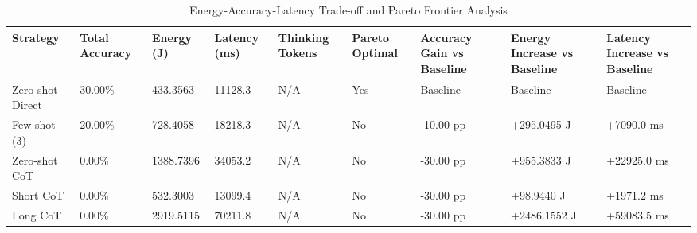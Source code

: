 \begin{table}
\caption{Energy-Accuracy-Latency Trade-off and Pareto Frontier Analysis}
\label{tab:tradeoff_comparison}
\begin{tabular}{lllllllll}
\toprule
Strategy & Total Accuracy & Energy (J) & Latency (ms) & Thinking Tokens & Pareto Optimal & Accuracy Gain vs Baseline & Energy Increase vs Baseline & Latency Increase vs Baseline \\
\midrule
Zero-shot Direct & 30.00\% & 433.3563 & 11128.3 & N/A & Yes & Baseline & Baseline & Baseline \\
Few-shot (3) & 20.00\% & 728.4058 & 18218.3 & N/A & No & -10.00 pp & +295.0495 J & +7090.0 ms \\
Zero-shot CoT & 0.00\% & 1388.7396 & 34053.2 & N/A & No & -30.00 pp & +955.3833 J & +22925.0 ms \\
Short CoT & 0.00\% & 532.3003 & 13099.4 & N/A & No & -30.00 pp & +98.9440 J & +1971.2 ms \\
Long CoT & 0.00\% & 2919.5115 & 70211.8 & N/A & No & -30.00 pp & +2486.1552 J & +59083.5 ms \\
\bottomrule
\end{tabular}
\end{table}
